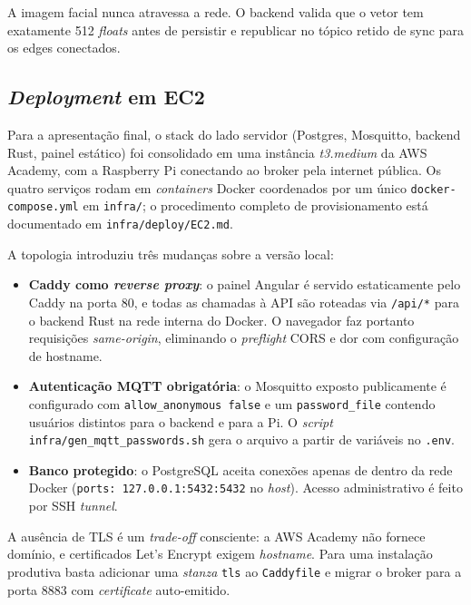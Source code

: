 \documentclass[12pt,a4paper]{report}
\begin{document}
A imagem facial nunca atravessa a rede. O backend valida que o vetor
tem exatamente 512 \textit{floats} antes de persistir e republicar no
tópico retido de sync para os edges conectados.

\subsection{\textit{Deployment} em EC2}
\label{sec:deploy-ec2}

Para a apresentação final, o stack do lado servidor (Postgres,
Mosquitto, backend Rust, painel estático) foi consolidado em uma
instância \textit{t3.medium} da AWS Academy, com a Raspberry Pi
conectando ao broker pela internet pública. Os quatro serviços rodam
em \textit{containers} Docker coordenados por um único
\texttt{docker-compose.yml} em \texttt{infra/}; o procedimento
completo de provisionamento está documentado em
\texttt{infra/deploy/EC2.md}.

A topologia introduziu três mudanças sobre a versão local:

\begin{itemize}
    \item \textbf{Caddy como \textit{reverse proxy}}: o painel
        Angular é servido estaticamente pelo Caddy na porta 80, e
        todas as chamadas à API são roteadas via \texttt{/api/*} para
        o backend Rust na rede interna do Docker. O navegador faz
        portanto requisições \textit{same-origin}, eliminando o
        \textit{preflight} CORS e dor com configuração de hostname.
    \item \textbf{Autenticação MQTT obrigatória}: o Mosquitto exposto
        publicamente é configurado com \texttt{allow\_anonymous false}
        e um \texttt{password\_file} contendo usuários distintos para
        o backend e para a Pi. O \textit{script}
        \texttt{infra/gen\_mqtt\_passwords.sh} gera o arquivo a
        partir de variáveis no \texttt{.env}.
    \item \textbf{Banco protegido}: o PostgreSQL aceita conexões
        apenas de dentro da rede Docker (\texttt{ports: 127.0.0.1:5432:5432}
        no \textit{host}). Acesso administrativo é feito por SSH
        \textit{tunnel}.
\end{itemize}

A ausência de TLS é um \textit{trade-off} consciente: a AWS Academy
não fornece domínio, e certificados Let's Encrypt exigem
\textit{hostname}. Para uma instalação produtiva basta adicionar uma
\textit{stanza} \texttt{tls} ao \texttt{Caddyfile} e migrar o broker
para a porta 8883 com \textit{certificate} auto-emitido.
\end{document}
